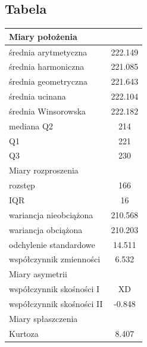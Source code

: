 \documentclass{article}
\theoremstyle{break}
\begin{document}
	\subsection{Tabela}
	\begin{longtable}[c]{| c | c |}
		\hline
		\multicolumn{2}{|l|}{\cellcolor[HTML]{DBDBDB}Miary położenia}    \\ \hline
		\multicolumn{1}{|l|}{średnia arytmetyczna}          & 222.149    \\ \hline
		\multicolumn{1}{|l|}{średnia harmoniczna}           & 221.085    \\ \hline
		\multicolumn{1}{|l|}{średnia geometryczna}          & 221.643    \\ \hline
		\multicolumn{1}{|l|}{średnia ucinana}               & 222.104    \\ \hline
		\multicolumn{1}{|l|}{średnia Winsorowska}           & 222.182    \\ \hline
		\multicolumn{1}{|l|}{mediana Q2}                    & 214        \\ \hline
		\multicolumn{1}{|l|}{Q1}                            & 221        \\ \hline
		\multicolumn{1}{|l|}{Q3}                            & 230        \\ \hline
		\multicolumn{2}{|l|}{\cellcolor[HTML]{DBDBDB}Miary rozproszenia} \\ \hline
		\multicolumn{1}{|l|}{rozstęp}                       & 166        \\ \hline
		\multicolumn{1}{|l|}{IQR}                           & 16         \\ \hline
		\multicolumn{1}{|l|}{wariancja nieobciążona}        & 210.568    \\ \hline
		\multicolumn{1}{|l|}{wariancja obciążona}           & 210.203    \\ \hline
		\multicolumn{1}{|l|}{odchylenie standardowe}        & 14.511     \\ \hline
		\multicolumn{1}{|l|}{współczynnik zmienności}       & 6.532      \\ \hline
		\multicolumn{2}{|l|}{\cellcolor[HTML]{DBDBDB}Miary asymetrii}    \\ \hline
		\multicolumn{1}{|l|}{współczynnik skośności I}      & XD          \\ \hline
		\multicolumn{1}{|l|}{współczynnik skośności II}     & -0.848     \\ \hline
		\multicolumn{2}{|l|}{\cellcolor[HTML]{DBDBDB}Miary spłaszczenia} \\ \hline
		\multicolumn{1}{|l|}{Kurtoza}                       & 8.407      \\ \hline
	\end{longtable}
	
\end{document}
